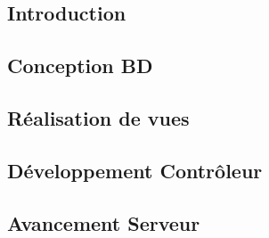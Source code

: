 

\subsection{Introduction}


\subsection{Conception BD}



\subsection{Réalisation de vues}



\subsection{Développement Contrôleur}



\subsection{Avancement Serveur}

